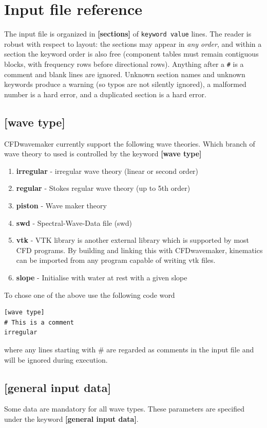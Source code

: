 \section{Input file reference}

The input file is organized in \textbf{[sections]} of \texttt{keyword value} lines. The reader is robust with respect to layout: the sections may appear in \emph{any order}, and within a section the keyword order is also free (component tables must remain contiguous blocks, with frequency rows before directional rows). Anything after a \texttt{\#} is a comment and blank lines are ignored. Unknown section names and unknown keywords produce a warning (so typos are not silently ignored), a malformed number is a hard error, and a duplicated section is a hard error.

\subsection{[wave type]}
CFDwavemaker currently support the following wave theories. Which branch of wave theory to used is controlled by the keyword \textbf{[wave type]}
\begin{enumerate}
    \item \textbf{irregular} - irregular wave theory (linear or second order)
    \item \textbf{regular} - Stokes regular wave theory (up to 5th order)
    \item \textbf{piston} - Wave maker theory
    \item \textbf{swd} -  Spectral-Wave-Data file (swd)
    \item \textbf{vtk} - VTK library is another external library which is supported by most CFD programs. By building and linking this with CFDwavemaker, kinematics can be imported from any program capable of writing vtk files.
    \item \textbf{slope} - Initialise with water at rest with a given slope
\end{enumerate}

To chose one of the above use the following code word
\begin{lstlisting}[]
[wave type]
# This is a comment
irregular
\end{lstlisting}
where any lines starting with \# are regarded as comments in the input file and will be ignored during execution.

\subsection{[general input data]}
Some data are mandatory for all wave types. These parameters are specified under the keyword \textbf{[general input data]}.

